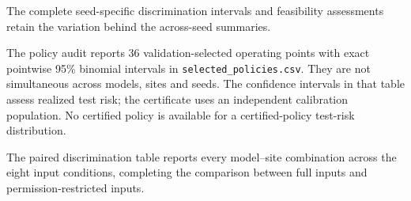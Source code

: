The complete seed-specific discrimination intervals and feasibility assessments retain the variation behind the across-seed summaries.




The policy audit reports 36 validation-selected operating points with exact pointwise 95\% binomial intervals in \texttt{selected\_policies.csv}. They are not simultaneous across models, sites and seeds. The confidence intervals in that table assess realized test risk; the certificate uses an independent calibration population. No certified policy is available for a certified-policy test-risk distribution.

The paired discrimination table reports every model--site combination across the eight input conditions, completing the comparison between full inputs and permission-restricted inputs.

